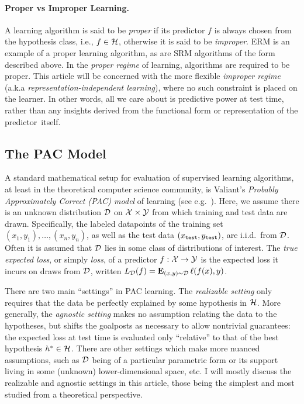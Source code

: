 \paragraph{Proper vs Improper Learning.} A learning algorithm is said to be \emph{proper} if its predictor $f$ is always chosen from the hypothesis class, i.e., $f \in \mathcal{H}$, otherwise it is said to be \emph{improper}. ERM  is an example of a proper learning algorithm, as are SRM algorithms of the form described above.  In the \emph{proper regime} of learning, algorithms are required to be proper. This article will be concerned with the more flexible \emph{improper regime} (a.k.a \emph{representation-independent learning}), where no such constraint is placed on the learner. In other words, all we care about is predictive power at test time, rather than any insights derived from the functional form or representation of the predictor~itself.


\subsection{The PAC Model}
A standard mathematical setup for evaluation of supervised learning algorithms, at least in the theoretical computer science community, is Valiant's \emph{Probably Approximately Correct (PAC) model} of learning (see e.g.~\cite{kearns_introduction_1994,mohri_foundations_2018}). Here, we assume there is an unknown distribution $\mathcal{D}$ on $\mathcal{X} \times \mathcal{Y}$ from which training and test data are  drawn.  Specifically, the labeled datapoints of the training set  $(x_1,y_1), \ldots, (x_n,y_n)$, as well as the test data  $(x_{\mathtt{test}},y_{\mathtt{test}})$, are i.i.d.~from $\mathcal{D}$. Often it is assumed that $\mathcal{D}$ lies in some class of distributions of interest. The \emph{true expected loss}, or simply \emph{loss}, of a predictor $f: \mathcal{X} \to \mathcal{Y}$ is the expected loss it incurs on draws from $\mathcal{D}$, written $L_\D(f) = \Ex_{(x,y) \sim \D} \ell(f(x),y)$.


There are two main ``settings'' in PAC learning. The  \emph{realizable setting} only requires that the data be perfectly explained by some hypothesis in $\mathcal{H}$. More generally, the \emph{agnostic setting} makes no assumption relating the data to the hypotheses, but shifts the goalposts as necessary to allow nontrivial guarantees: the expected loss at test time is evaluated only ``relative'' to that of the best hypothesis $h^* \in \mathcal{H}$. There are other settings which make more nuanced assumptions, such as $\mathcal{D}$ being of a particular parametric form or its support living in some (unknown) lower-dimensional space, etc. I will mostly discuss the realizable and agnostic settings in this article, those being the simplest and most studied from a theoretical perspective. %

